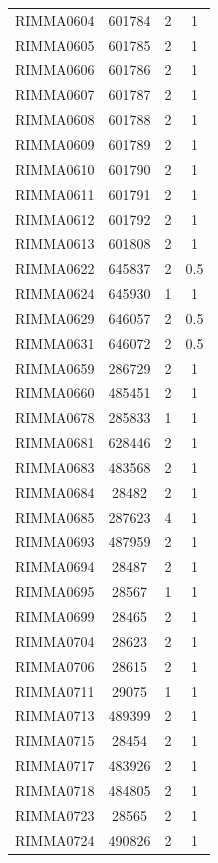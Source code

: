 \documentclass[11pt]{article}
\newcounter{rowno}
\begin{document}
\begin{scriptsize}
\begin{longtable}{>{\stepcounter{rowno}}cccc}
    RIMMA0604 & 601784 & 2     & 1 \\
    RIMMA0605 & 601785 & 2     & 1 \\
    RIMMA0606 & 601786 & 2     & 1 \\
    RIMMA0607 & 601787 & 2     & 1 \\
    RIMMA0608 & 601788 & 2     & 1 \\
    RIMMA0609 & 601789 & 2     & 1 \\
    RIMMA0610 & 601790 & 2     & 1 \\
    RIMMA0611 & 601791 & 2     & 1 \\
    RIMMA0612 & 601792 & 2     & 1 \\
    RIMMA0613 & 601808 & 2     & 1 \\
    RIMMA0622 & 645837 & 2     & 0.5 \\
    RIMMA0624 & 645930 & 1     & 1 \\
    RIMMA0629 & 646057 & 2     & 0.5 \\
    RIMMA0631 & 646072 & 2     & 0.5 \\
    RIMMA0659 & 286729 & 2     & 1 \\
    RIMMA0660 & 485451 & 2     & 1 \\
    RIMMA0678 & 285833 & 1     & 1 \\
    RIMMA0681 & 628446 & 2     & 1 \\
    RIMMA0683 & 483568 & 2     & 1 \\
    RIMMA0684 & 28482 & 2     & 1 \\
    RIMMA0685 & 287623 & 4     & 1 \\
    RIMMA0693 & 487959 & 2     & 1 \\
    RIMMA0694 & 28487 & 2     & 1 \\
    RIMMA0695 & 28567 & 1     & 1 \\
    RIMMA0699 & 28465 & 2     & 1 \\
    RIMMA0704 & 28623 & 2     & 1 \\
    RIMMA0706 & 28615 & 2     & 1 \\
    RIMMA0711 & 29075 & 1     & 1 \\
    RIMMA0713 & 489399 & 2     & 1 \\
    RIMMA0715 & 28454 & 2     & 1 \\
    RIMMA0717 & 483926 & 2     & 1 \\
    RIMMA0718 & 484805 & 2     & 1 \\
    RIMMA0723 & 28565 & 2     & 1 \\
    RIMMA0724 & 490826 & 2     & 1 \\

\end{longtable}
\end{scriptsize}
\end{document}
